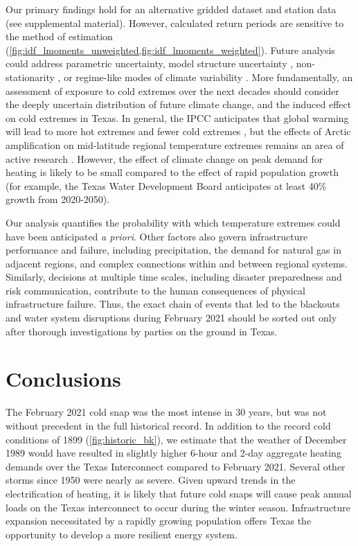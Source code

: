 \documentclass[12pt]{iopart}
\begin{document}
Our primary findings hold for an alternative gridded dataset and station data (see supplemental material).
However, calculated return periods are sensitive to the method of estimation (\cref{fig:idf_lmoments_unweighted,fig:idf_lmoments_weighted}).
Future analysis could address parametric uncertainty, model structure uncertainty \cite{wong_floodrisk:2018}, non-stationarity \cite{Milly:2008dg}, or regime-like modes of climate variability \cite{DossGollin:2019}.
More fundamentally, an assessment of exposure to cold extremes over the next decades should consider the deeply uncertain distribution of future climate change, and the induced effect on cold extremes in Texas.
In general, the IPCC anticipates that global warming will lead to more hot extremes and fewer cold extremes \cite{ipcc_ar5:2014}, but the effects of Arctic amplification on mid-latitude regional temperature extremes remains an area of active research \cite{Barnes:2013fp,Cohen:2014gx,Screen:2013ho}.
However, the effect of climate change on peak demand for heating is likely to be small compared to the effect of rapid population growth (for example, the Texas Water Development Board \cite{texaswaterplan:2012} anticipates at least 40\% growth from 2020-2050).

Our analysis quantifies the probability with which temperature extremes could have been anticipated \emph{a priori}.
Other factors also govern infrastructure performance and failure, including precipitation, the demand for natural gas in adjacent regions, and complex connections within and between regional systems.
Similarly, decisions at multiple time scales, including disaster preparedness and risk communication, contribute to the human consequences of physical infrastructure failure.
Thus, the exact chain of events that led to the blackouts and water system disruptions during February 2021 should be sorted out only after thorough investigations by parties on the ground in Texas.

\section{Conclusions}

The February 2021 cold snap was the most intense in 30 years, but was not without precedent in the full historical record.
In addition to the record cold conditions of 1899 (\cref{fig:historic_bk}), we estimate that the weather of December 1989 would have resulted in slightly higher 6-hour and 2-day aggregate heating demands over the Texas Interconnect compared to February 2021.
Several other storms since 1950 were nearly as severe.
Given upward trends in the electrification of heating, it is likely that future cold snaps will cause peak annual loads on the Texas interconnect to occur during the winter season.
Infrastructure expansion necessitated by a rapidly growing population offers Texas the opportunity to develop a more resilient energy system.
\end{document}
